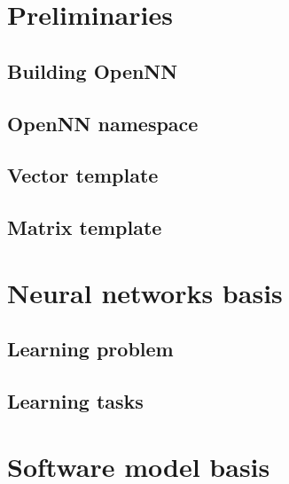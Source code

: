 \documentclass[pdftex, a4paper, 10pt]{book}
\begin{document}
\chapter{Preliminaries}\label{Preliminaries}

\section{Building OpenNN}\label{BuildingOpenNN}


\section{OpenNN namespace}\label{OpenNNNamespace}


\section{Vector template}\label{VectorTemplate}


\section{Matrix template}\label{MatrixTemplate}



\chapter{Neural networks basis}\label{NeuralNetworksBasis}


\section{Learning problem}\label{LearningProblem}


\section{Learning tasks}\label{LearningTasks}



\chapter{Software model basis}\label{SoftwareModelBasis}

\end{document}
